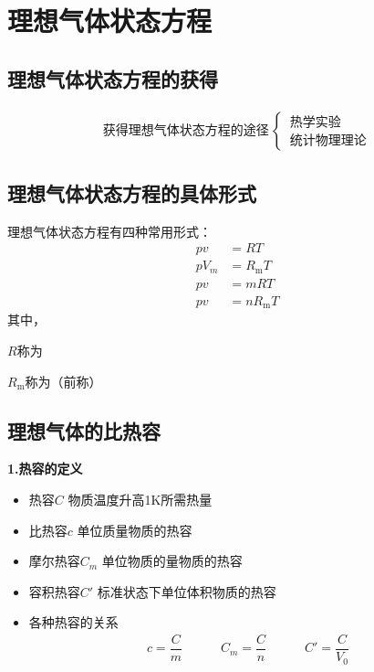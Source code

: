 \section{理想气体状态方程}
\subsection{理想气体状态方程的获得}
\vspace*{-2em}
\begin{align*}
	\mbox{获得理想气体状态方程的途径}\,
	\begin{cases}
		\, \mbox{热学实验}\\
		\, \mbox{统计物理理论}
	\end{cases}
\end{align*}

\subsection{理想气体状态方程的具体形式}
理想气体状态方程有四种常用形式：
\begin{align}
	pv &= RT\\
	pV_m &= R_{\text{m}} T\\
	pv &= mRT\\
	pv &= nR_{\text{m}}T
\end{align}
其中，

$R$称为

$R_{\text{m}}$称为（前称）
\vspace*{0.5em}

\subsection{理想气体的比热容}
\noindent \textbf{1.热容的定义}
\begin{itemize}
	\item 热容$C$ \quad 物质温度升高1K所需热量
	\item 比热容$c$ \quad 单位质量物质的热容
	\item 摩尔热容$C_m$ \quad 单位物质的量物质的热容
	\item 容积热容$C'$ \quad 标准状态下单位体积物质的热容
	\item 各种热容的关系
	\begin{align*}
		c = \dfrac{C}{m} \quad \quad \quad C_m = \dfrac{C}{n} \quad \quad \quad C' = \dfrac{C}{V_0}
	\end{align*}
\end{itemize}


